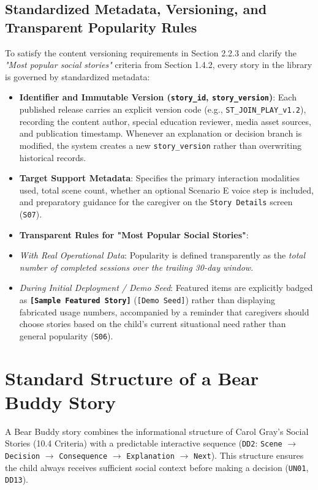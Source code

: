 \subsection{Standardized Metadata, Versioning, and Transparent Popularity Rules}


To satisfy the content versioning requirements in Section 2.2.3 and clarify the \textit{"Most popular social stories"} criteria from Section 1.4.2, every story in the library is governed by standardized metadata:

\begin{itemize}
  \item \textbf{Identifier and Immutable Version (\texttt{story\_id}, \texttt{story\_version})}: Each published release carries an explicit version code (e.g., \texttt{ST\_JOIN\_PLAY\_v1.2}), recording the content author, special education reviewer, media asset sources, and publication timestamp. Whenever an explanation or decision branch is modified, the system creates a new \texttt{story\_version} rather than overwriting historical records.
  \item \textbf{Target Support Metadata}: Specifies the primary interaction modalities used, total scene count, whether an optional Scenario E voice step is included, and preparatory guidance for the caregiver on the \texttt{Story Details} screen (\texttt{S07}).
  \item \textbf{Transparent Rules for "Most Popular Social Stories"}:
  \item \textit{With Real Operational Data}: Popularity is defined transparently as the \textit{total number of completed sessions over the trailing 30-day window}.
  \item \textit{During Initial Deployment / Demo Seed}: Featured items are explicitly badged as \textbf{\texttt{[Sample Featured Story]}} (\texttt{[Demo Seed]}) rather than displaying fabricated usage numbers, accompanied by a reminder that caregivers should choose stories based on the child's current situational need rather than general popularity (\texttt{S06}).
\end{itemize}



\section{Standard Structure of a Bear Buddy Story}


A Bear Buddy story combines the informational structure of Carol Gray's Social Stories (10.4 Criteria) with a predictable interactive sequence (\texttt{DD2}: \texttt{Scene} $\rightarrow$ \texttt{Decision} $\rightarrow$ \texttt{Consequence} $\rightarrow$ \texttt{Explanation} $\rightarrow$ \texttt{Next}). This structure ensures the child always receives sufficient social context before making a decision (\texttt{UN01}, \texttt{DD13}).



